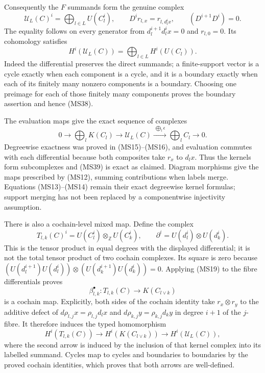 \documentclass[
]{article}
\begin{document}
Consequently the \(F\) summands form the genuine complex \[
\mathscr U_L(C)^i=\bigoplus_{l\in L}U(C_l^i),\qquad
D^i r_{l,x}=r_{l,d_l^i x},\qquad (D^{i+1}D^i)=0.
\tag{MS37}
\] The equality follows on every generator from \(d_l^{i+1}d_l^i x=0\)
and \(r_{l,0}=0\). Its cohomology satisfies \[
H^i(\mathscr U_L(C))=\bigoplus_{l\in L}H^i(U(C_l)).
\tag{MS38}
\] Indeed the differential preserves the direct summands; a
finite-support vector is a cycle exactly when each component is a cycle,
and it is a boundary exactly when each of its finitely many nonzero
components is a boundary. Choosing one preimage for each of those
finitely many components proves the boundary assertion and hence (MS38).

The evaluation maps give the exact sequence of complexes \[
0\longrightarrow\bigoplus_l K(C_l)
\longrightarrow\mathscr U_L(C)
\xrightarrow{\ \bigoplus_l\epsilon\ }\bigoplus_l C_l
\longrightarrow0.
\tag{MS39}
\] Degreewise exactness was proved in (MS15)--(MS16), and evaluation
commutes with each differential because both composites take \(r_x\) to
\(d_lx\). Thus the kernels form subcomplexes and (MS39) is exact as
claimed. Diagram morphisms give the maps prescribed by (MS12), summing
contributions when labels merge. Equations (MS13)--(MS14) remain their
exact degreewise kernel formulas; support merging has not been replaced
by a componentwise injectivity assumption.

There is also a cochain-level mixed map. Define the complex \[
T_{l,k}(C)^i=U(C_l^i)\otimes_{\mathbb Z}U(C_k^i),\qquad
\partial^i=U(d_l^i)\otimes U(d_k^i).
\tag{MS40}
\] This is the tensor product in equal degrees with the displayed
differential; it is not the total tensor product of two cochain
complexes. Its square is zero because
\((U(d_l^{i+1})U(d_l^i))\otimes(U(d_k^{i+1})U(d_k^i))=0\). Applying
(MS19) to the fibre differentials proves \[
\beta_{l,k}^\bullet:T_{l,k}(C)\longrightarrow K(C_{l\vee k})
\tag{MS41}
\] is a cochain map. Explicitly, both sides of the cochain identity take
\(r_x\otimes r_y\) to the additive defect of
\(d\rho_{l,j}x=\rho_{l,j}d_lx\) and \(d\rho_{k,j}y=\rho_{k,j}d_ky\) in
degree \(i+1\) of the \(j\)-fibre. It therefore induces the typed
homomorphism \[
H^i(T_{l,k}(C))\longrightarrow H^i(K(C_{l\vee k}))
\longrightarrow H^i(\mathscr U_L(C)),
\tag{MS42}
\] where the second arrow is induced by the inclusion of that kernel
complex into its labelled summand. Cycles map to cycles and boundaries
to boundaries by the proved cochain identities, which proves that both
arrows are well-defined.
\end{document}
